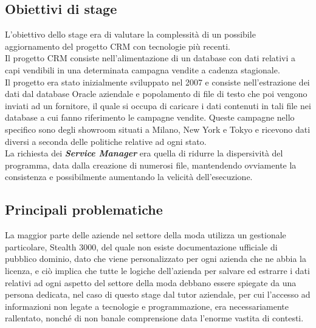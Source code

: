 \subsection{Obiettivi di stage}
L'obiettivo dello stage era di valutare la complessità di un possibile aggiornamento del progetto CRM con tecnologie più recenti.\\
Il progetto CRM consiste nell'alimentazione di un database con dati relativi a capi vendibili in una determinata campagna vendite a cadenza stagionale.\\
Il progetto era stato inizialmente sviluppato nel 2007 e consiste nell'estrazione dei dati dal database Oracle aziendale e popolamento di file di testo che poi vengono inviati ad un fornitore, il quale si occupa di caricare i dati contenuti in tali file nei database a cui fanno riferimento le campagne vendite. Queste campagne nello specifico sono degli showroom situati a Milano, New York e Tokyo e ricevono dati diversi a seconda delle politiche relative ad ogni stato.\\
La richiesta dei \textbf{\textit{Service Manager}} era quella di ridurre la dispersività del programma, data dalla creazione di numerosi file, mantendendo ovviamente la consistenza e possibilmente aumentando la velicità dell'esecuzione.

\subsection{Principali problematiche}
La maggior parte delle aziende nel settore della moda utilizza un gestionale particolare, Stealth 3000, del quale non esiste documentazione ufficiale di pubblico dominio, dato che viene personalizzato per ogni azienda che ne abbia la licenza, e ciò implica che tutte le logiche dell'azienda per salvare ed estrarre i dati relativi ad ogni aspetto del settore della moda debbano essere spiegate da una persona dedicata, nel caso di questo stage dal tutor aziendale, per cui l'accesso ad informazioni non legate a tecnologie e programmazione, era necessariamente rallentato, nonché di non banale comprensione data l'enorme vastita di contesti.